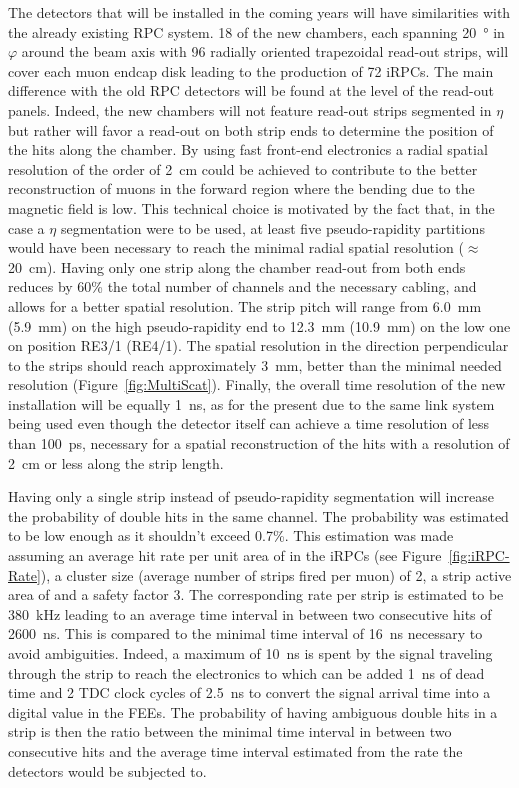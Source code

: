 	The detectors that will be installed in the coming years will have similarities with the already existing RPC system. 18 of the new chambers, each spanning \SI{20}{\degree} in $\varphi$ around the beam axis with 96 radially oriented trapezoidal read-out strips, will cover each muon endcap disk leading to the production of 72 iRPCs. The main difference with the old RPC detectors will be found at the level of the read-out panels. Indeed, the new chambers will not feature read-out strips segmented in $\eta$ but rather will favor a read-out on both strip ends to determine the position of the hits along the chamber. By using fast front-end electronics a radial spatial resolution of the order of \SI{2}{cm} could be achieved to contribute to the better reconstruction of muons in the forward region where the bending due to the magnetic field is low. This technical choice is motivated by the fact that, in the case a $\eta$ segmentation were to be used, at least five pseudo-rapidity partitions would have been necessary to reach the minimal radial spatial resolution ($\approx$ \SI{20}{cm}). Having only one strip along the chamber read-out from both ends reduces by 60\% the total number of channels and the necessary cabling, and allows for a better spatial resolution. The strip pitch will range from \SI{6.0}{mm} (\SI{5.9}{mm}) on the high pseudo-rapidity end to \SI{12.3}{mm} (\SI{10.9}{mm}) on the low one on position RE3/1 (RE4/1). The spatial resolution in the direction perpendicular to the strips should reach approximately \SI{3}{mm}, better than the minimal needed resolution (Figure~\ref{fig:MultiScat}). Finally, the overall time resolution of the new installation will be equally \SI{1}{ns}, as for the present due to the same link system being used even though the detector itself can achieve a time resolution of less than \SI{100}{ps}, necessary for a spatial reconstruction of the hits with a resolution of \SI{2}{cm} or less along the strip length.
	
	Having only a single strip instead of pseudo-rapidity segmentation will increase the probability of double hits in the same channel. The probability was estimated to be low enough as it shouldn't exceed 0.7\%. This estimation was made assuming an average hit rate per unit area of  in the iRPCs (see Figure~\ref{fig:iRPC-Rate}), a cluster size (average number of strips fired per muon) of 2, a strip active area of  and a safety factor 3. The corresponding rate per strip is estimated to be \SI{380}{kHz} leading to an average time interval in between two consecutive hits of \SI{2600}{ns}. This is compared to the minimal time interval of \SI{16}{ns} necessary to avoid ambiguities. Indeed, a maximum of \SI{10}{ns} is spent by the signal traveling through the strip to reach the electronics to which can be added \SI{1}{ns} of dead time and 2 \acf{TDC} clock cycles of \SI{2.5}{ns} to convert the signal arrival time into a digital value in the FEEs. The probability of having ambiguous double hits in a strip is then the ratio between the minimal time interval in between two consecutive hits and the average time interval estimated from the rate the detectors would be subjected to.

